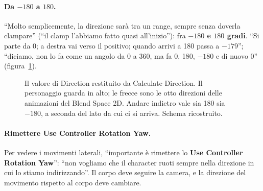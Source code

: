 \paragraph{Da $-180$ a $180$.} ``Molto semplicemente, la direzione sarà tra un range,
sempre senza doverla clampare'' (``il clamp l'abbiamo fatto quasi all'inizio''): fra
\textbf{$-180$ e $180$ gradi}. ``Si parte da 0; a destra vai verso il positivo; quando
arrivi a 180 passa a $-179$''; ``diciamo, non lo fa come un angolo da 0 a 360, ma fa 0,
180, $-180$ e di nuovo 0'' (figura~\ref{ue9:fig:direzione}).

\begin{figure}[htbp]
\centering
{}
\caption{Il valore di Direction restituito da Calculate Direction. Il personaggio guarda
in alto; le frecce sono le otto direzioni delle animazioni del Blend Space 2D. Andare
indietro vale sia 180 sia $-180$, a seconda del lato da cui ci si arriva. Schema
ricostruito.}
\label{ue9:fig:direzione}
\end{figure}

\paragraph{Rimettere Use Controller Rotation Yaw.} Per vedere i movimenti laterali,
``importante è rimettere lo \textbf{Use Controller Rotation Yaw}'': ``non vogliamo che il
character ruoti sempre nella direzione in cui lo stiamo indirizzando''. Il corpo deve
seguire la camera, e la direzione del movimento rispetto al corpo deve cambiare.

